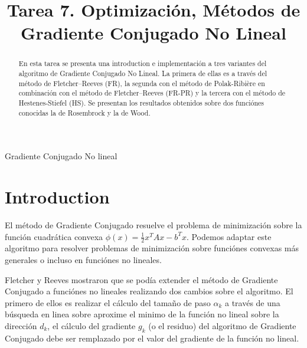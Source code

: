 \documentclass[conference]{IEEEtran}
\begin{document}
\title{Tarea 7. Optimización, Métodos de Gradiente Conjugado No Lineal}

\author{
}

\maketitle

\begin{abstract}

En esta tarea se presenta una introduction e implementación a tres variantes del algoritmo de
Gradiente Conjugado No Lineal. La primera de ellas es a través del método de Fletcher–Reeves (FR),
la segunda con el método de Polak-Ribière en combinación con el método de Fletcher–Reeves (FR-PR) y
la tercera con el método de Hestenes-Stiefel (HS). Se presentan los resultados obtenidos sobre dos
funciónes conocidas la de Rosembrock y la de Wood.


\end{abstract}

\begin{IEEEkeywords}
Gradiente Conjugado No lineal
\end{IEEEkeywords}

\section{Introduction}

El método de Gradiente Conjugado resuelve el problema de minimización sobre la función cuadrática
convexa  $\phi(x) = \frac{1}{2} x^TAx - b^Tx$. Podemos adaptar este algoritmo para resolver
problemas de minimización sobre funciónes convexas más generales o incluso en funciónes no
lineales.

Fletcher y Reeves mostraron que se podía extender el método de Gradiente Conjugado a funciónes no
lineales realizando dos cambios sobre el algoritmo. El primero de ellos es realizar el cálculo del
tamaño de paso $\alpha_k$ a través de una búsqueda en linea sobre aproxime el minimo de la función
no lineal sobre la dirección $d_k$, el cálculo del gradiente $g_k$ (o el residuo) del algoritmo de
Gradiente Conjugado debe ser remplazado por el valor del gradiente de la función no lineal.
\end{document}
